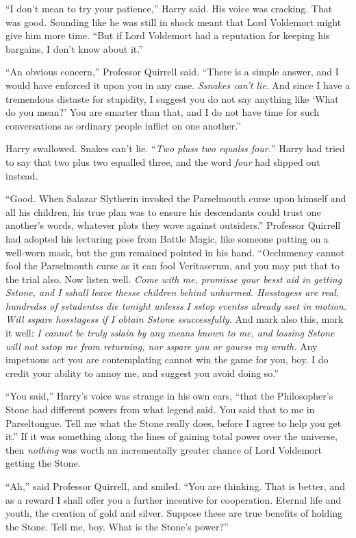 ``I don't mean to try your patience,'' Harry said. His voice was cracking. That was good. Sounding like he was still in shock meant that Lord Voldemort might give him more time. ``But if Lord Voldemort had a reputation for keeping his bargains, I don't know about it.''

``An obvious concern,'' Professor Quirrell said. ``There is a simple answer, and I would have enforced it upon you in any case. \emph{Ssnakes can't lie}. And since I have a tremendous distaste for stupidity, I suggest you do not say anything like `What do you mean?' You are smarter than that, and I do not have time for such conversations as ordinary people inflict on one another.''

Harry swallowed. Snakes can't lie. ``\emph{Two pluss two equalss four.}'' Harry had tried to say that two plus two equalled three, and the word \emph{four} had slipped out instead.

``Good. When Salazar Slytherin invoked the Parselmouth curse upon himself and all his children, his true plan was to ensure his descendants could trust one another's words, whatever plots they wove against outsiders.'' Professor Quirrell had adopted his lecturing pose from Battle Magic, like someone putting on a well-worn mask, but the gun remained pointed in his hand. ``Occlumency cannot fool the Parselmouth curse as it can fool Veritaserum, and you may put that to the trial also. Now listen well. \emph{Come with me, promisse your besst aid in getting Sstone, and I sshall leave thesse children behind unharmed. Hosstagess are real, hundredss of sstudentss die tonight unlesss I sstop eventss already sset in motion. Will sspare hosstagess if I obtain Sstone ssuccessfully.} And mark also this, mark it well: \emph{I cannot be truly sslain by any means known to me, and lossing Sstone will not sstop me from returning, nor sspare you or yourss my wrath.} Any impetuous act you are contemplating cannot win the game for you, boy. I do credit your ability to annoy me, and suggest you avoid doing so.''

``You said,'' Harry's voice was strange in his own ears, ``that the Philosopher's Stone had different powers from what legend said. You said that to me in Parseltongue. Tell me what the Stone really does, before I agree to help you get it.'' If it was something along the lines of gaining total power over the universe, then \emph{nothing} was worth an incrementally greater chance of Lord Voldemort getting the Stone.

``Ah,'' said Professor Quirrell, and smiled. ``You are thinking. That is better, and as a reward I shall offer you a further incentive for cooperation. Eternal life and youth, the creation of gold and silver. Suppose these are true benefits of holding the Stone. Tell me, boy. What is the Stone's power?''

